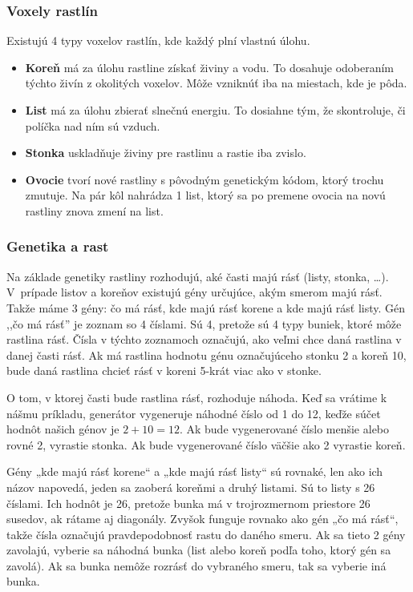 \documentclass[12pt]{article}
\begin{document}
\newpage
\subsubsection{Voxely rastlín}

Existujú 4 typy voxelov rastlín, kde každý plní vlastnú úlohu.

\begin{itemize}
	\item \textbf{Koreň} má za úlohu rastline získať živiny a vodu. To dosahuje
	odoberaním týchto živín z okolitých voxelov. Môže vzniknúť iba na
	miestach, kde je pôda.

	\item \textbf{List} má za úlohu zbierať slnečnú energiu. To dosiahne tým, že
	skontroluje, či políčka nad ním sú vzduch.

	\item \textbf{Stonka} uskladňuje živiny pre rastlinu a rastie iba zvislo.
	
	\item \textbf{Ovocie} tvorí nové rastliny s pôvodným genetickým kódom,
	ktorý trochu zmutuje. Na pár kôl nahrádza 1 list, ktorý sa po premene
	ovocia na novú rastliny znova zmení na list.
\end{itemize} 

\subsubsection{Genetika a rast}

Na základe genetiky rastliny rozhodujú, aké časti majú rásť (listy, stonka, \dots).
V~prípade listov a koreňov existujú gény určujúce, akým smerom majú rásť.
Takže máme 3 gény: čo má rásť, kde majú rásť korene a kde majú rásť listy.
Gén ,,čo má rásť'' je zoznam so 4 číslami. Sú 4, pretože sú 4 typy buniek,
ktoré môže rastlina rásť. Čísla v týchto zoznamoch označujú,
ako veľmi chce daná rastlina v danej časti rásť. Ak má rastlina hodnotu génu
označujúceho stonku 2 a koreň 10, bude daná rastlina chcieť rásť v koreni
5-krát viac ako v stonke.

O tom, v ktorej časti bude rastlina rásť, rozhoduje náhoda. Keď sa vrátime
k nášmu príkladu, generátor vygeneruje náhodné číslo od 1 do 12, keďže súčet hodnôt
našich génov je $2 + 10 = 12$. Ak bude vygenerované číslo menšie alebo rovné 2,
vyrastie stonka. Ak bude vygenerované číslo väčšie ako 2 vyrastie koreň.

Gény „kde majú rásť korene“ a „kde majú rásť listy“ sú rovnaké,
len ako ich názov napovedá, jeden sa zaoberá koreňmi a druhý listami.
Sú to listy s 26 číslami. Ich hodnôt je 26, pretože bunka má
v trojrozmernom priestore 26 susedov, ak rátame aj diagonály.
Zvyšok funguje rovnako ako gén „čo má rásť“, takže čísla označujú
pravdepodobnosť rastu do daného smeru. Ak sa tieto 2 gény zavolajú, vyberie
sa náhodná bunka (list alebo koreň podľa toho, ktorý gén sa zavolá).
Ak sa bunka nemôže rozrásť do vybraného smeru, tak sa vyberie iná bunka.
\end{document}
